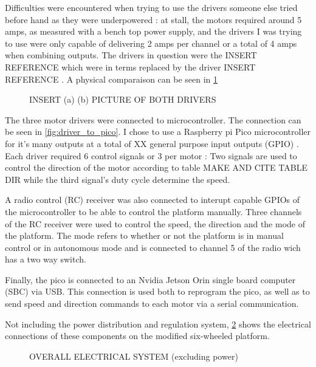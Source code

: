 \documentclass[11pt]{article}
\begin{document}
                Difficulties were encountered when trying to use the drivers someone else tried before hand as they were underpowered : at stall, the motors required around 5 amps, as measured with a bench top power supply, and the drivers I was trying to use were only capable of delivering 2 amps per channel or a total of 4 amps when combining outputs. The drivers in question were the \color{red} INSERT REFERENCE \color{black} which were in terms replaced by the driver \color{red} INSERT REFERENCE \color{black}. A physical comparaison can be seen in \ref{fig:drivers_compraison}
                
                
                \begin{figure}[h]
                    \centering
                    INSERT (a) (b) PICTURE OF BOTH DRIVERS
                    \label{fig:drivers_compraison}
                \end{figure}

                The three motor drivers were connected to microcontroller. The connection can be seen in \ref{fig:driver_to_pico}.
                I chose to use a Raspberry pi Pico microcontroller for it's many outputs at a total of \color{red} XX general purpose input outputs (GPIO) \color{black}. Each driver required 6 control signals or 3 per motor : Two signals are used to control the direction of the motor according to table \color{red} MAKE AND CITE TABLE DIR \color{black} while the third signal's duty cycle determine the speed.

                A radio control (RC) receiver was also connected to interupt capable GPIOs of the microcontroller to be able to control the platform manually. Three channels of the RC receiver were used to control the speed, the direction and the mode of the platform. The mode refers to whether or not the platform is in manual control or in autonomous mode and is connected to channel 5 of the radio wich has a two way switch.

                Finally, the pico is connected to an Nvidia Jetson Orin single board computer (SBC) via USB. This connection is used both to reprogram the pico, as well as to send speed and direction commands to each motor via a serial communication. 

                Not including the power distribution and regulation system, \ref{fig:overall_electical_system} shows the electrical connections of these components on the modified six-wheeled platform.

                \begin{figure}[h]
                    \centering
                    OVERALL ELECTRICAL SYSTEM (excluding power)
                    \label{fig:overall_electical_system}
                \end{figure}
\end{document}
